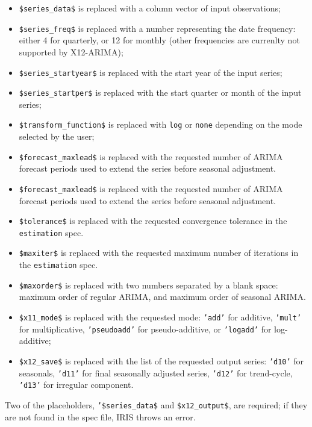  \begin{itemize}
 \item
   \texttt{\$series\_data\$} is replaced with a column vector of input
   observations;
 \item
   \texttt{\$series\_freq\$} is replaced with a number representing the
   date frequency: either 4 for quarterly, or 12 for monthly (other
   frequencies are currenlty not supported by X12-ARIMA);
 \item
   \texttt{\$series\_startyear\$} is replaced with the start year of the
   input series;
 \item
   \texttt{\$series\_startper\$} is replaced with the start quarter or
   month of the input series;
 \item
   \texttt{\$transform\_function\$} is replaced with \texttt{log} or
   \texttt{none} depending on the mode selected by the user;
 \item
   \texttt{\$forecast\_maxlead\$} is replaced with the requested number
   of ARIMA forecast periods used to extend the series before seasonal
   adjustment.
 \item
   \texttt{\$forecast\_maxlead\$} is replaced with the requested number
   of ARIMA forecast periods used to extend the series before seasonal
   adjustment.
 \item
   \texttt{\$tolerance\$} is replaced with the requested convergence
   tolerance in the \texttt{estimation} spec.
 \item
   \texttt{\$maxiter\$} is replaced with the requested maximum number of
   iterations in the \texttt{estimation} spec.
 \item
   \texttt{\$maxorder\$} is replaced with two numbers separated by a
   blank space: maximum order of regular ARIMA, and maximum order of
   seasonal ARIMA.
 \item
   \texttt{\$x11\_mode\$} is replaced with the requested mode:
   \texttt{'add'} for additive, \texttt{'mult'} for multiplicative,
   \texttt{'pseudoadd'} for pseudo-additive, or \texttt{'logadd'} for
   log-additive;
 \item
   \texttt{\$x12\_save\$} is replaced with the list of the requested
   output series: \texttt{'d10'} for seasonals, \texttt{'d11'} for final
   seasonally adjusted series, \texttt{'d12'} for trend-cycle,
   \texttt{'d13'} for irregular component.
 \end{itemize}
 
 Two of the placeholders, \texttt{'\$series\_data\$} and
 \texttt{\$x12\_output\$}, are required; if they are not found in the
 spec file, IRIS throws an error.
 
